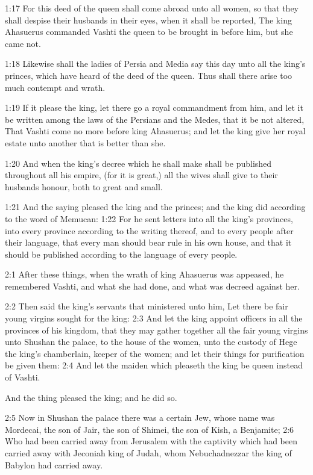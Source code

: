 1:17 For this deed of the queen shall come abroad unto all women, so
that they shall despise their husbands in their eyes, when it shall be
reported, The king Ahasuerus commanded Vashti the queen to be brought
in before him, but she came not.

1:18 Likewise shall the ladies of Persia and Media say this day unto
all the king's princes, which have heard of the deed of the queen.
Thus shall there arise too much contempt and wrath.

1:19 If it please the king, let there go a royal commandment from him,
and let it be written among the laws of the Persians and the Medes,
that it be not altered, That Vashti come no more before king
Ahasuerus; and let the king give her royal estate unto another that is
better than she.

1:20 And when the king's decree which he shall make shall be published
throughout all his empire, (for it is great,) all the wives shall give
to their husbands honour, both to great and small.

1:21 And the saying pleased the king and the princes; and the king did
according to the word of Memucan: 1:22 For he sent letters into all
the king's provinces, into every province according to the writing
thereof, and to every people after their language, that every man
should bear rule in his own house, and that it should be published
according to the language of every people.

2:1 After these things, when the wrath of king Ahasuerus was appeased,
he remembered Vashti, and what she had done, and what was decreed
against her.

2:2 Then said the king's servants that ministered unto him, Let there
be fair young virgins sought for the king: 2:3 And let the king
appoint officers in all the provinces of his kingdom, that they may
gather together all the fair young virgins unto Shushan the palace, to
the house of the women, unto the custody of Hege the king's
chamberlain, keeper of the women; and let their things for
purification be given them: 2:4 And let the maiden which pleaseth the
king be queen instead of Vashti.

And the thing pleased the king; and he did so.

2:5 Now in Shushan the palace there was a certain Jew, whose name was
Mordecai, the son of Jair, the son of Shimei, the son of Kish, a
Benjamite; 2:6 Who had been carried away from Jerusalem with the
captivity which had been carried away with Jeconiah king of Judah,
whom Nebuchadnezzar the king of Babylon had carried away.

